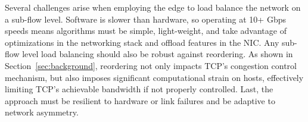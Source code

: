 


%
%
%

Several challenges arise when employing the edge to load balance the network
on a sub-flow level. Software is slower than hardware, so operating at 10+ Gbps speeds means
algorithms must be simple, light-weight, and take advantage of optimizations in
the networking stack and offload features in the NIC. Any sub-flow level load balancing should also be 
robust against reordering.
As shown in Section~\ref{sec:background}, 
reordering not only impacts TCP's congestion control mechanism, but also imposes significant computational
strain on hosts, effectively limiting TCP's achievable bandwidth if not properly controlled. Last, the approach must be 
resilient to hardware or link failures and be adaptive to network asymmetry.


